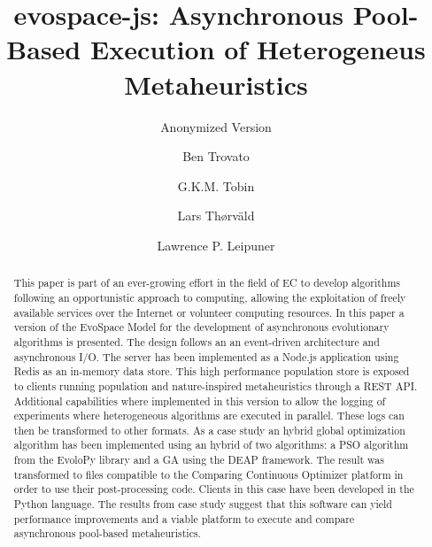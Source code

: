 \documentclass[sigconf]{acmart}
\begin{document}
\title{evospace-js: Asynchronous Pool-Based Execution of Heterogeneus Metaheuristics}
\subtitle{Anonymized Version}


\author{Ben Trovato}

\author{G.K.M. Tobin}

\author{Lars Th{\o}rv{\"a}ld}

\author{Lawrence P. Leipuner}



\begin{abstract}

This paper is part of an ever-growing effort in the field of EC to develop algorithms
following an opportunistic approach to computing, allowing the exploitation
of freely available services over the Internet or volunteer computing resources.
In this paper a version of the EvoSpace Model for the development of asynchronous
evolutionary algorithms is presented. The design follows an an event-driven 
architecture and asynchronous I/O. The server has been implemented as a Node.js
application using Redis as an in-memory data store. This high performance population
store is exposed to clients running population and nature-inspired metaheuristics
through a REST API. Additional capabilities where implemented in this version to
allow the logging of experiments where heterogeneous algorithms are executed in parallel.
These logs can then be transformed to other formats. As a case study
an hybrid global optimization algorithm has been implemented using an hybrid of
two algorithms: a PSO algorithm from the EvoloPy library and a GA using the DEAP framework.
The result was transformed to files compatible to the Comparing Continuous Optimizer platform
in order to use their post-processing code. Clients in this case have been developed in 
the Python language. The results from case study suggest that this software can yield
performance improvements and a viable platform to execute and compare asynchronous pool-based
metaheuristics.   
\end{abstract}
\end{document}
